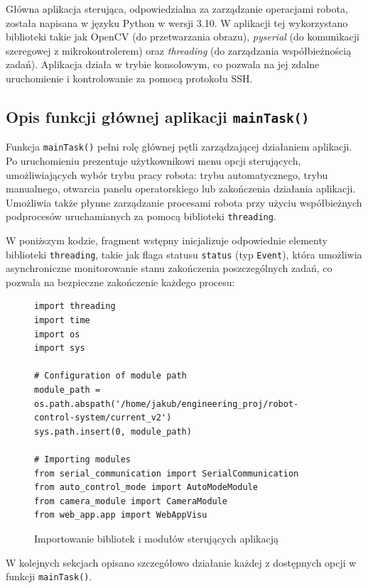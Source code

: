 Główna aplikacja sterująca, odpowiedzialna za zarządzanie operacjami robota, została napisana w języku Python w wersji 3.10. W aplikacji tej wykorzystano biblioteki takie jak OpenCV (do przetwarzania obrazu), \textit{pyserial} (do komunikacji szeregowej z mikrokontrolerem) oraz \textit{threading} (do zarządzania współbieżnością zadań). Aplikacja działa w trybie konsolowym, co pozwala na jej zdalne uruchomienie i kontrolowanie za pomocą protokołu SSH.


\subsection{Opis funkcji głównej aplikacji \texttt{mainTask()}}

Funkcja \texttt{mainTask()} pełni rolę głównej pętli zarządzającej działaniem aplikacji. Po uruchomieniu prezentuje użytkownikowi menu opcji sterujących, umożliwiających wybór trybu pracy robota: trybu automatycznego, trybu manualnego, otwarcia panelu operatorskiego lub zakończenia działania aplikacji. Umożliwia także płynne zarządzanie procesami robota przy użyciu współbieżnych podprocesów uruchamianych za pomocą biblioteki \texttt{threading}.

W poniższym kodzie, fragment wstępny inicjalizuje odpowiednie elementy biblioteki \texttt{threading}, takie jak flaga statusu \texttt{status} (typ \texttt{Event}), która umożliwia asynchroniczne monitorowanie stanu zakończenia poszczególnych zadań, co pozwala na bezpieczne zakończenie każdego procesu:

\begin{figure}[H]
  \centering
  \begin{lstlisting}
import threading
import time
import os
import sys

# Configuration of module path
module_path = os.path.abspath('/home/jakub/engineering_proj/robot-control-system/current_v2')
sys.path.insert(0, module_path)

# Importing modules
from serial_communication import SerialCommunication
from auto_control_mode import AutoModeModule
from camera_module import CameraModule
from web_app.app import WebAppVisu
  \end{lstlisting}
  \caption{Importowanie bibliotek i modułów sterujących aplikacją}
  \label{fig:imported_modules}
\end{figure}

W kolejnych sekcjach opisano szczegółowo działanie każdej z dostępnych opcji w funkcji \texttt{mainTask()}.

